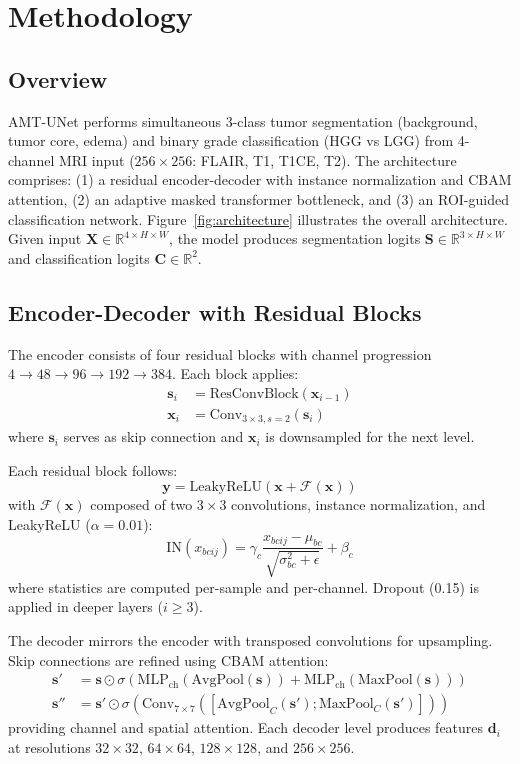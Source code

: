 \section{Methodology}

\subsection{Overview}

AMT-UNet performs simultaneous 3-class tumor segmentation (background, tumor core, edema) and binary grade classification (HGG vs LGG) from 4-channel MRI input ($256 \times 256$: FLAIR, T1, T1CE, T2). The architecture comprises: (1) a residual encoder-decoder with instance normalization and CBAM attention, (2) an adaptive masked transformer bottleneck, and (3) an ROI-guided classification network. Figure~\ref{fig:architecture} illustrates the overall architecture. Given input $\mathbf{X} \in \mathbb{R}^{4 \times H \times W}$, the model produces segmentation logits $\mathbf{S} \in \mathbb{R}^{3 \times H \times W}$ and classification logits $\mathbf{C} \in \mathbb{R}^{2}$.



\subsection{Encoder-Decoder with Residual Blocks}

The encoder consists of four residual blocks with channel progression $4 \rightarrow 48 \rightarrow 96 \rightarrow 192 \rightarrow 384$. Each block applies:
\begin{align*}
\mathbf{s}_i &= \text{ResConvBlock}(\mathbf{x}_{i-1}) \\
\mathbf{x}_i &= \text{Conv}_{3\times3,s=2}(\mathbf{s}_i)
\end{align*}
where $\mathbf{s}_i$ serves as skip connection and $\mathbf{x}_i$ is downsampled for the next level.

Each residual block follows:
\[
\mathbf{y} = \text{LeakyReLU}(\mathbf{x} + \mathcal{F}(\mathbf{x}))
\]
with $\mathcal{F}(\mathbf{x})$ composed of two $3\times3$ convolutions, instance normalization, and LeakyReLU ($\alpha=0.01$):
\[
\text{IN}(x_{bcij}) = \gamma_c \frac{x_{bcij} - \mu_{bc}}{\sqrt{\sigma_{bc}^2 + \epsilon}} + \beta_c
\]
where statistics are computed per-sample and per-channel. Dropout (0.15) is applied in deeper layers ($i \geq 3$).

The decoder mirrors the encoder with transposed convolutions for upsampling. Skip connections are refined using CBAM attention:
\begin{align*}
\mathbf{s}' &= \mathbf{s} \odot \sigma(\text{MLP}_{\text{ch}}(\text{AvgPool}(\mathbf{s})) + \text{MLP}_{\text{ch}}(\text{MaxPool}(\mathbf{s}))) \\
\mathbf{s}'' &= \mathbf{s}' \odot \sigma(\text{Conv}_{7\times7}([\text{AvgPool}_C(\mathbf{s}'); \text{MaxPool}_C(\mathbf{s}')]))
\end{align*}
providing channel and spatial attention. Each decoder level produces features $\mathbf{d}_i$ at resolutions $32\times32$, $64\times64$, $128\times128$, and $256\times256$.

